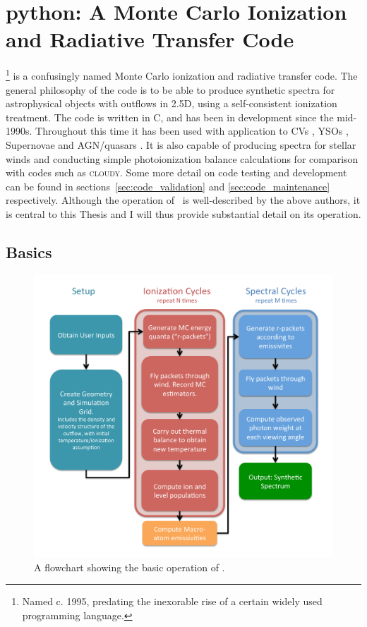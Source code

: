 
\section{{\sc python}: A Monte Carlo Ionization and Radiative Transfer Code}
\label{sec:python}

\py\footnote{Named c. 1995, predating the inexorable rise of a certain widely used
programming language.} is a confusingly named 
Monte Carlo ionization and radiative transfer code. 
The general philosophy of the code is to be able to produce synthetic spectra
for astrophysical objects with outflows in 2.5D, using a self-consistent ionization 
treatment. The code is written in C, and has been in development since the mid-1990s.
Throughout this time it has been used with application to CVs \citep{LK02, M15},
YSOs \citep{simmacro2005}, Supernovae \citep{kerzendorfsim} and AGN/quasars 
\citep{higginbottom2013,H14,M16}. It is also capable of producing spectra 
for stellar winds and conducting simple photoionization balance calculations for
comparison with codes such as \textsc{cloudy}. Some more detail on code testing and 
development can be found in sections~\ref{sec:code_validation} and \ref{sec:code_maintenance}
respectively. Although the operation of \py\ is well-described by the above authors,
it is central to this Thesis and I will thus provide substantial detail on its operation. 

\subsection{Basics}

\begin{figure}
\centering
\includegraphics[width=1.0\textwidth]{figures/03-radtrans/flowchart.pdf}
\caption
{
A flowchart showing the basic operation of \py.
} 
\label{fig:flowchart}
\end{figure}

